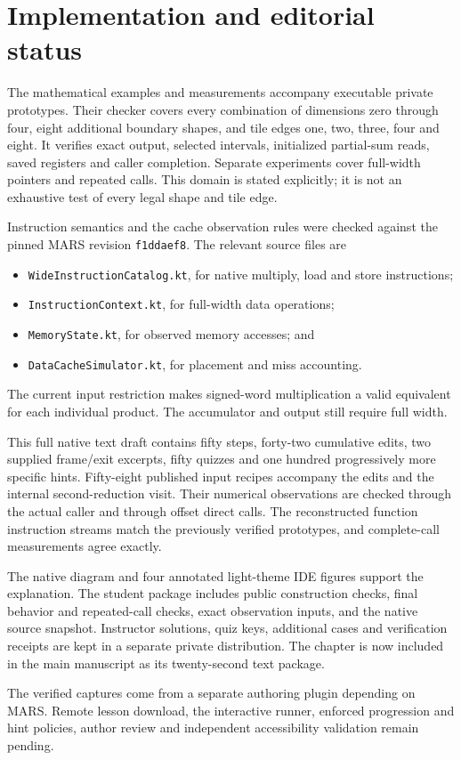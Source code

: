 \section*{Implementation and editorial status}
The mathematical examples and measurements accompany executable private prototypes.
Their checker covers every combination of dimensions zero through four, eight additional
boundary shapes, and tile edges one, two, three, four and eight. It verifies exact
output, selected intervals, initialized partial-sum reads, saved registers and caller
completion. Separate experiments cover full-width pointers and repeated calls.
This domain is stated explicitly; it is not an exhaustive test of every legal
shape and tile edge.

Instruction semantics and the cache observation rules were checked against the pinned
MARS revision \texttt{f1ddaef8}. The relevant source files are
\begin{itemize}
\item \texttt{WideInstructionCatalog.kt}, for native multiply, load and store instructions;
\item \texttt{InstructionContext.kt}, for full-width data operations;
\item \texttt{MemoryState.kt}, for observed memory accesses; and
\item \texttt{DataCacheSimulator.kt}, for placement and miss accounting.
\end{itemize}
The current input restriction makes signed-word
multiplication a valid equivalent for each individual product. The accumulator and
output still require full width.

This full native text draft contains fifty steps, forty-two cumulative edits,
two supplied frame/exit excerpts, fifty quizzes and one hundred progressively
more specific hints. Fifty-eight published input recipes accompany the edits
and the internal second-reduction visit. Their numerical observations are checked
through the actual caller and through offset direct calls. The reconstructed
function instruction streams match the previously verified prototypes, and
complete-call measurements agree exactly.

The native diagram and four annotated light-theme IDE figures support the explanation.
The student package includes public construction checks, final behavior and repeated-call
checks, exact observation inputs, and the native source snapshot. Instructor solutions,
quiz keys, additional cases and verification receipts are kept in a separate private
distribution. The chapter is now included in the main manuscript as its twenty-second
text package.

The verified captures come from a separate authoring plugin depending on MARS. Remote
lesson download, the interactive runner, enforced progression and hint policies, author
review and independent accessibility validation remain pending.
